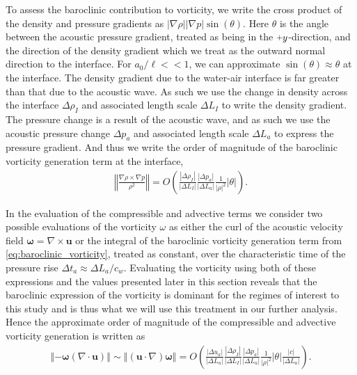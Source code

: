 \documentclass{jfm}%
\newcommand{\orderof}[1]{\ensuremath{\textit{O}\left(#1\right)}}
\newcommand{\abs}[1]{\ensuremath{\left|#1\right|}}
\newcommand{\norm}[1]{\ensuremath{\left\Vert#1\right\Vert}}
\newcommand{\plus}{\raisebox{.2\height}{\scalebox{.8}{+}}}
\begin{document}
To assess the baroclinic contribution to vorticity, we write the cross
product of the density and pressure gradients as
$\abs{\nabla \rho} \abs{\nabla p} \sin{\left(\theta\right)}$. Here
$\theta$ is the angle between the acoustic pressure gradient, treated
as being in the $\plus y$-direction, and the direction of the density
gradient which we treat as the outward normal direction to the
interface. For $a_0/\ell<<1$, we can approximate
$\sin{\left(\theta\right)}\approx\theta$ at the interface. The density
gradient due to the water-air interface is far greater than that due
to the acoustic wave. As such we use the change in density across the
interface $\Delta \rho_I$ and associated length scale $\Delta L_I$ to
write the density gradient. The pressure change is a result of the
acoustic wave, and as such we use the acoustic pressure change
$\Delta p_a$ and associated length scale $\Delta L_a$ to express the
pressure gradient. And thus we write the order of magnitude of the
baroclinic vorticity generation term at the interface,
\begin{align}
  \label{eq:baroclinic_vorticity}%
  \norm{\frac{\nabla\rho\times\nabla p}{\rho^2}} =%
  \orderof{\frac{\abs{\Delta \rho_I}}{\abs{\Delta L_I}}\frac{\abs{\Delta p_a}}{\abs{\Delta L_a}}\frac{1}{\abs{\rho}^2}\abs{\theta}}.%
\end{align}

In the evaluation of the compressible and advective terms we consider
two possible evaluations of the vorticity $\omega$ as either the curl
of the acoustic velocity field
$\boldsymbol{\omega}=\nabla\times\boldsymbol{u}$ or the integral of
the baroclinic vorticity generation term from
\eqref{eq:baroclinic_vorticity}, treated as constant, over the
characteristic time of the pressure rise
$\Delta t_a\approx\Delta L_a/c_w$. Evaluating the vorticity using both
of these expressions and the values presented later in this section
reveals that the baroclinic expression of the vorticity is dominant
for the regimes of interest to this study and is thus what we will use
this treatment in our further analysis. Hence the approximate order of magnitude of the compressible and
advective vorticity generation is written as
\begin{align}
  \label{eq:compressible_advective_vorticity}%
  \norm{-\boldsymbol{\omega}\left(\nabla\cdot\boldsymbol{u}\right)}\sim \norm{\left(\boldsymbol{u}\cdot\nabla\right)\boldsymbol{\omega}} = %
  \orderof{%
  \frac{\abs{\Delta u_a}}{\abs{\Delta L_a}} \frac{\abs{\Delta \rho_I}}{\abs{\Delta L_I}}%
  \frac{\abs{\Delta p_a}}{\abs{\Delta L_a}} \frac{1}{\abs{\rho}^2}\abs{\theta}\frac{\abs{c}}{\abs{\Delta L_a}}%
  }.%
\end{align}
\end{document}
